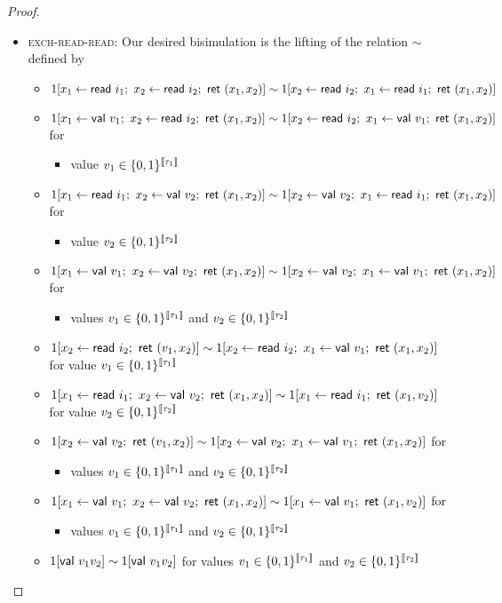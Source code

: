 \begin{proof}
\begin{itemize}
\begin{itemize}
\end{itemize}
\item \textsc{exch-read-read}: Our desired bisimulation is the lifting of the relation $\sim$ defined by
\begin{itemize}
\item $1[x_1 \leftarrow \read{i_1}; \ x_2 \leftarrow \read{i_2}; \ \ret{(x_1,x_2)}] \sim 1[x_2 \leftarrow \read{i_2}; \ x_1 \leftarrow \read{i_1}; \ \ret{(x_1,x_2)}]$
\item $1[x_1 \leftarrow \mathsf{val} \ v_1; \ x_2 \leftarrow \mathsf{read} \ i_2; \ \mathsf{ret} \ (x_1,x_2)] \sim 1[x_2 \leftarrow \mathsf{read} \ i_2; \ x_1 \leftarrow \mathsf{val} \ v_1; \ \mathsf{ret} \ (x_1,x_2)]$ for
\begin{itemize}
\item value $v_1 \in \{0,1\}^{\llbracket \tau_1 \rrbracket}$
\end{itemize}
\item $1[x_1 \leftarrow \mathsf{read} \ i_1; \ x_2 \leftarrow \mathsf{val} \ v_2; \ \mathsf{ret} \ (x_1,x_2)] \sim 1[x_2 \leftarrow \mathsf{val} \ v_2; \ x_1 \leftarrow \mathsf{read} \ i_1; \ \mathsf{ret} \ (x_1,x_2)]$ for
\begin{itemize}
\item value $v_2 \in \{0,1\}^{\llbracket \tau_2 \rrbracket}$
\end{itemize}
\item $1[x_1 \leftarrow \mathsf{val} \ v_1; \ x_2 \leftarrow \mathsf{val} \ v_2; \ \mathsf{ret} \ (x_1,x_2)] \sim 1[x_2 \leftarrow \mathsf{val} \ v_2; \ x_1 \leftarrow \mathsf{val} \ v_1; \ \mathsf{ret} \ (x_1,x_2)]$ for
\begin{itemize}
\item values $v_1 \in \{0,1\}^{\llbracket \tau_1 \rrbracket}$ and $v_2 \in \{0,1\}^{\llbracket \tau_2 \rrbracket}$
\end{itemize}
\item $1[x_2 \leftarrow \read{i_2}; \ \ret{(v_1,x_2)}] \sim 1[x_2 \leftarrow \read{i_2}; \ x_1 \leftarrow \val{v_1}; \ \ret{(x_1,x_2)}]$ for value $v_1 \in \{0,1\}^{\llbracket \tau_1 \rrbracket}$
\item $1[x_1 \leftarrow \mathsf{read} \ i_1; \ x_2 \leftarrow \mathsf{val} \ v_2; \ \mathsf{ret} \ (x_1,x_2)] \sim 1[x_1 \leftarrow \mathsf{read} \ i_1; \ \mathsf{ret} \ (x_1,v_2)]$ for value $v_2 \in \{0,1\}^{\llbracket \tau_2 \rrbracket}$
\item $1[x_2 \leftarrow \val{v_2}; \ \ret{(v_1,x_2)}] \sim 1[x_2 \leftarrow \val{v_2}; \ x_1 \leftarrow \val{v_1}; \ \ret{(x_1,x_2)}]$ for
\begin{itemize}
\item values $v_1 \in \{0,1\}^{\llbracket \tau_1 \rrbracket}$ and $v_2 \in \{0,1\}^{\llbracket \tau_2 \rrbracket}$
\end{itemize}
\item $1[x_1 \leftarrow \mathsf{val} \ v_1; \ x_2 \leftarrow \mathsf{val} \ v_2; \ \mathsf{ret} \ (x_1,x_2)] \sim 1[x_1 \leftarrow \mathsf{val} \ v_1; \ \mathsf{ret} \ (x_1,v_2)]$ for
\begin{itemize}
\item values $v_1 \in \{0,1\}^{\llbracket \tau_1 \rrbracket}$ and $v_2 \in \{0,1\}^{\llbracket \tau_2 \rrbracket}$
\end{itemize}
\item $1[\mathsf{val} \ v_1 v_2] \sim 1[\mathsf{val} \ v_1 v_2]$ for values $v_1 \in \{0,1\}^{\llbracket \tau_1 \rrbracket}$ and $v_2 \in \{0,1\}^{\llbracket \tau_2 \rrbracket}$
\end{itemize}
\end{itemize}
\end{proof}

